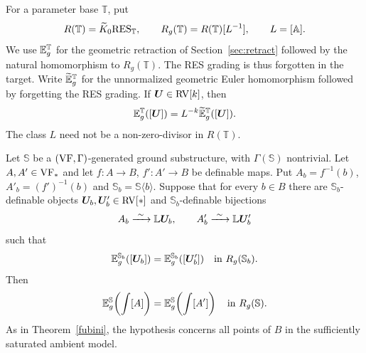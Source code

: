 \begin{nota}\label{nota:geometric:fubini:target}
For a parameter base $\mathbb T$, put
\[
 R(\mathbb T)=\widetilde K_0\mathrm{RES}_{\mathbb T},\qquad
 R_g(\mathbb T)=R(\mathbb T)[L^{-1}],\qquad L=[\mathbb A].
\]
We use $\mathbb E_g^{\mathbb T}$ for the geometric retraction of Section~\ref{sec:retract}
followed by the natural homomorphism to $R_g(\mathbb T)$.
The RES grading is thus forgotten in the target. Write $\widetilde{\mathbb E}_g^{\mathbb T}$
for the unnormalized geometric Euler homomorphism followed by forgetting
the RES grading. If $\bm U\in\mathrm{RV}[k]$, then
\begin{equation}\label{geometric:fubini:normalization}
 \mathbb E_g^{\mathbb T}([\bm U])=L^{-k}\widetilde{\mathbb E}_g^{\mathbb T}([\bm U]).
\end{equation}
The class $L$ need not be a non-zero-divisor in $R(\mathbb T)$.

\end{nota}

\begin{prop}\label{prop:geometric:fubini}
Let $\mathbb S$ be a $(\mathrm{VF},\Gamma)$-generated ground substructure,
with $\Gamma(\mathbb S)$ nontrivial. Let $A,A'\in\mathrm{VF}_*$ and let
$f:A\to B$, $f':A'\to B$ be definable maps. Put
$A_b=f^{-1}(b)$, $A'_b=(f')^{-1}(b)$ and
$\mathbb S_b=\mathbb S\langle b\rangle$.
Suppose that for every $b\in B$ there are
$\mathbb S_b$-definable objects $\bm U_b,\bm U'_b\in\mathrm{RV}[*]$ and
$\mathbb S_b$-definable bijections
\[
 A_b\xrightarrow{\ \sim\ }\mathbb L\bm U_b,
 \qquad A'_b\xrightarrow{\ \sim\ }\mathbb L\bm U'_b
\]
such that
\[
 \mathbb E_g^{\mathbb S_b}([\bm U_b])
 =\mathbb E_g^{\mathbb S_b}([\bm U'_b])
 \quad\text{in }R_g(\mathbb S_b).
\]
Then
\[
 \mathbb E_g^{\mathbb S}\!\left(\int[A]\right)
 =\mathbb E_g^{\mathbb S}\!\left(\int[A']\right)
 \quad\text{in }R_g(\mathbb S).
\]
As in Theorem~\ref{fubini}, the hypothesis concerns all points of $B$ in the
sufficiently saturated ambient model.
\end{prop}


